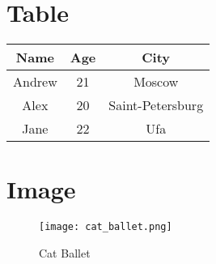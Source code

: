 \documentclass{article}
\begin{document}
\section{Table}

\begin{tabular}{|c|c|c|}
\hline
Name & Age & City \\
\hline
Andrew & 21 & Moscow \\
\hline
Alex & 20 & Saint-Petersburg \\
\hline
Jane & 22 & Ufa \\
\hline
\end{tabular}

\section{Image}

\begin{figure}[h]
\centering
\texttt{[image: cat\_ballet.png]}
\caption{Cat Ballet}
\end{figure}
\end{document}
